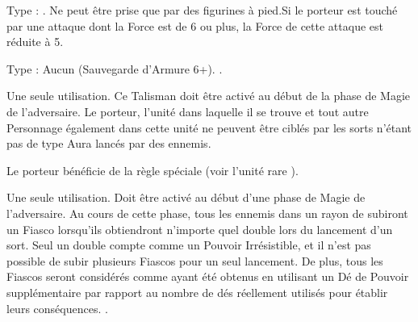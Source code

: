 \endpricelist

\armymagicalarmour

\startpricelist

Type : \ha{}. Ne peut être prise que par des figurines à pied.\newline Si le porteur est touché par une attaque dont la Force est de 6 ou plus, la Force de cette attaque est réduite à 5.

Type : Aucun (Sauvegarde d'Armure 6+). .

\endpricelist

\armytalismans

\startpricelist

Une seule utilisation. Ce Talisman doit être activé au début de la phase de Magie de l'adversaire. Le porteur, l'unité dans laquelle il se trouve et tout autre Personnage également dans cette unité ne peuvent être ciblés par les sorts n'étant pas de type Aura lancés par des \wizards{} ennemis.

\endpricelist

\armyenchanteditems

\startpricelist

Le porteur bénéficie de la règle spéciale \stoneskin{} (voir l'unité rare \rockaurochs{}).

\endpricelist

\armyarcaneitems

\startpricelist

Une seule utilisation. Doit être activé au début d'une phase de Magie de l'adversaire. Au cours de cette phase, tous les \wizards{} ennemis dans un rayon de  subiront un Fiasco lorsqu'ils obtiendront n'importe quel double lors du lancement d'un sort. Seul un double  compte comme un Pouvoir Irrésistible, et il n'est pas possible de subir plusieurs Fiascos pour un seul lancement. De plus, tous les Fiascos seront considérés comme ayant été obtenus en utilisant un Dé de Pouvoir supplémentaire par rapport au nombre de dés réellement utilisés pour établir leurs conséquences. .

\endpricelist

\armymagicalbanners

